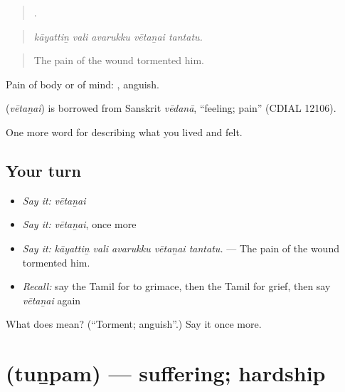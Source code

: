 \begin{quote}
    .
\end{quote}

\begin{quote}
\emph{kāyattiṉ vali avarukku vētaṉai tantatu.}
\end{quote}

\begin{quote}
The pain of the wound tormented him.
\end{quote}

Pain of body or of mind:  , anguish.

\begin{cousinweb}
\textbf{} (\emph{vētaṉai}) is borrowed from Sanskrit \emph{vēdanā}, \textquotedblleft{}feeling; pain\textquotedblright{} (CDIAL 12106).
\end{cousinweb}

\begin{grammarlens}[title={What you've built}]
One more word for describing what you lived and felt.
\end{grammarlens}

\subsection*{Your turn}
\begin{itemize}
\raggedright
  \item \emph{Say it:} \emph{vētaṉai}
  \item \emph{Say it:} \emph{vētaṉai}, once more
  \item \emph{Say it:} \emph{kāyattiṉ vali avarukku vētaṉai tantatu.} — The pain of the wound tormented him.
  \item \emph{Recall:} say the Tamil for to grimace, then the Tamil for grief, then say \emph{vētaṉai} again
\end{itemize}

\begin{tcolorbox}[breakable,colback=teal!4,colframe=teal!35!black,title={Before you move on}]
What does  mean? (\textquotedblleft{}Torment; anguish\textquotedblright{}.) Say it once more.
\end{tcolorbox}
\section[\texorpdfstring{\ta{துன்பம்} (tuṉpam)}{துன்பம் (tuṉpam)}]{ (tuṉpam) — suffering; hardship}

